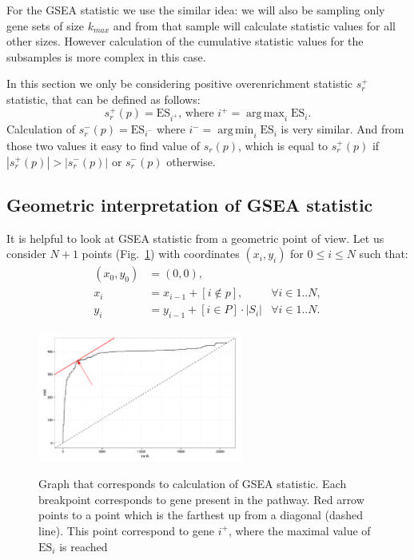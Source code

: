 \documentclass[runningheads,a4paper]{llncs}
\DeclareMathOperator*{\argmax}{arg\,max}
\DeclareMathOperator*{\argmin}{arg\,min}
\begin{document}
For the GSEA statistic we use the similar idea: we will also be sampling only 
gene sets of size $k_{max}$ and from that sample will calculate
statistic values for all other sizes. However calculation of the 
cumulative statistic values for the subsamples is more complex
in this case.

In this section we only be considering positive
overenrichment statistic 
$s^+_{r}$ statistic, that can be defined as follows:
\[
s^+_r(p) = \mathrm{ES}_{i^+} \text{, where } i^+ =  \argmax_i \mathrm{ES}_i.
\]
Calculation of $s^-_{r}(p) = \mathrm{ES}_{i^-}$ 
where $i^- =  \argmin_i\mathrm{ES}_i$
is very similar. And from those two values it easy to find 
value of $s_r(p)$, which is equal to $s^+_r(p)$ if
$|s^+_r(p)| > |s^-_r(p)|$ or $s^-_r(p)$ otherwise.


\subsection{Geometric interpretation of GSEA statistic}

It is helpful to look at GSEA statistic from a geometric point of view.
Let us consider $N+1$ points (Fig.~\ref{fig_gsea_stat}) with coordinates $(x_i, y_i)$ for $0 \le i \le N$
such that:
\begin{align}
    \label{eq_simple_0}
    (x_0, y_0) &= (0, 0), & \\ 
    \label{eq_simple_x}
    x_i &= x_{i-1} + [i \not \in p],       &\forall i \in 1..N, \\
    \label{eq_simple_y}
    y_i &= y_{i-1} + [i \in P] \cdot |S_i| &\forall i \in 1..N.
\end{align}

\begin{figure}[h]
    \centering
    { \includegraphics[width=0.6\textwidth]{gsea_stat_with_line.png} }
    \caption{Graph that corresponds to calculation of GSEA 
    statistic. Each breakpoint corresponds to gene present in the pathway. 
    Red arrow points to a point which is the farthest
up from a diagonal (dashed line). This point correspond to gene $i^+$, 
where the maximal value of $\mathrm{ES}_i$ is reached}%
    \label{fig_gsea_stat}%
\end{figure}
\end{document}
